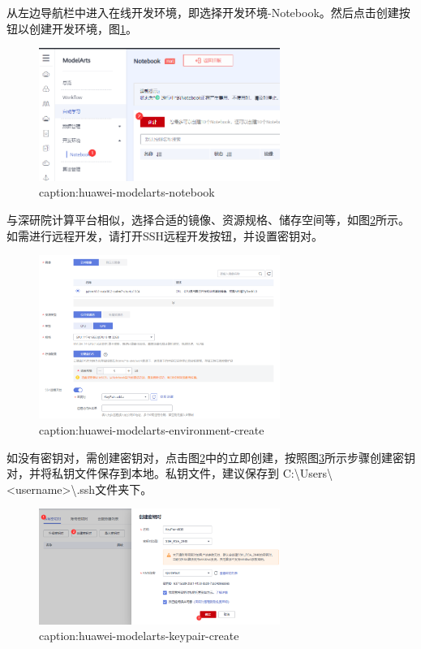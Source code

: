 从左边导航栏中进入在线开发环境，即选择开发环境-Notebook。然后点击创建按钮以创建开发环境，图\ref{fig:huawei-modelarts-notebook}。

\begin{figure}[htbp]
	\centering
	\includegraphics[width=0.7\textwidth]{figures/huawei-modelarts-notebook.png}
	\caption{caption:huawei-modelarts-notebook}
	\label{fig:huawei-modelarts-notebook}
\end{figure}


与深研院计算平台相似，选择合适的镜像、资源规格、储存空间等，如图\ref{fig:huawei-modelarts-environment-create}所示。如需进行远程开发，请打开SSH远程开发按钮，并设置密钥对。

\begin{figure}[htbp]
	\centering
	\includegraphics[width=0.7\textwidth]{figures/huawei-modelarts-environment-create.png}
	\caption{caption:huawei-modelarts-environment-create}
	\label{fig:huawei-modelarts-environment-create}
\end{figure}

如没有密钥对，需创建密钥对，点击图\ref{fig:huawei-modelarts-environment-create}中的立即创建，按照图\ref{fig:huawei-modelarts-keypair-create}所示步骤创建密钥对，并将私钥文件保存到本地。私钥文件，建议保存到 C:\textbackslash Users\textbackslash <username>\textbackslash .ssh文件夹下。

\begin{figure}[htbp]
	\centering
	\includegraphics[width=0.7\textwidth]{figures/huawei-modelarts-keypair-create.png}
	\caption{caption:huawei-modelarts-keypair-create}
	\label{fig:huawei-modelarts-keypair-create}
\end{figure}

